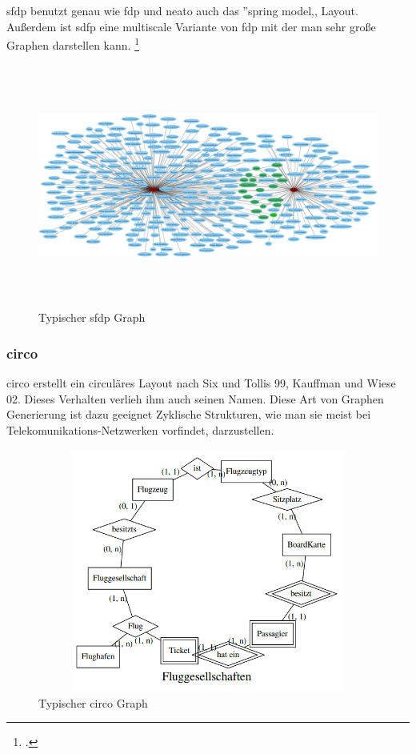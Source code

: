 \noindent
sfdp benutzt genau wie fdp und neato auch das ''spring model,, Layout. Außerdem ist sdfp eine multiscale Variante von fdp mit der man sehr große Graphen darstellen kann.
\footcite{noauthor_performance_nodate}
\begin{figure}[H]
	\begin{center}
		\includegraphics[width=14cm, height=8cm]{images/sfdp.jpg}
		\caption{Typischer sfdp Graph}
		\label{sfdp}
	\end{center}
\end{figure}

\noindent
\subsubsection{circo}
\fib{}
\noindent
circo erstellt ein circuläres Layout nach Six und Tollis 99, Kauffman und Wiese 02. Dieses Verhalten verlieh ihm auch seinen Namen. Diese Art von Graphen Generierung ist dazu geeignet Zyklische Strukturen, wie man sie meist bei Telekomunikations-Netzwerken vorfindet, darzustellen.

\begin{figure}[H]
	\begin{center}
		\includegraphics[width=14cm, height=8cm]{images/circo.png}
		\caption{Typischer circo Graph}
		\label{circo}
	\end{center}
\end{figure}

